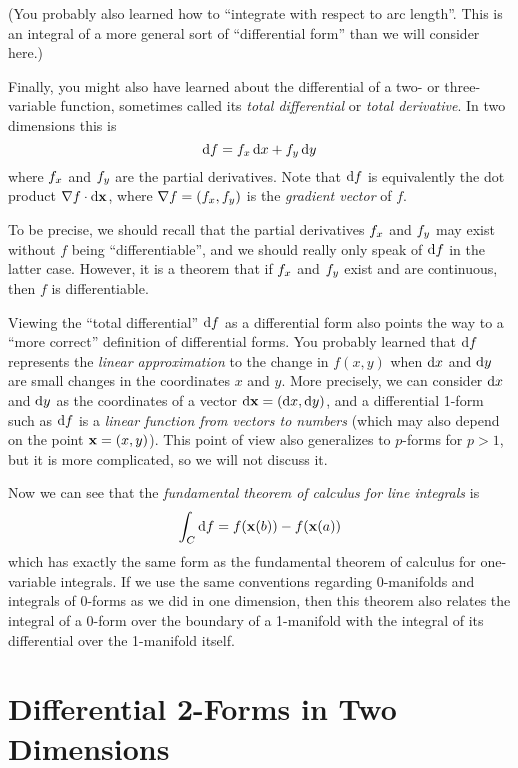 \documentclass[12pt]{amsart}
\begin{document}
(You probably also learned how to ``integrate with respect to arc length''.
This is an integral of a more general sort of ``differential form'' than we will consider here.)

Finally, you might also have learned about the differential of a two- or three-variable function, sometimes called its \emph{total differential} or \emph{total derivative}.
In two dimensions this is
\begin{equation}
  {\ensuremath{\mathrm{d} f}} = {f}_{x} \,{\mathrm{d} x} + {f}_{y} \,{\mathrm{d} y}\label{eq:differential-of-a-0form-in-2D}
\end{equation}
where ${f}_{x}$ and ${f}_{y}$ are the partial derivatives.
Note that ${\mathrm{d} f}$ is equivalently the dot product $\nabla f \cdot {\ensuremath{\mathrm{d} \mathbf{x}}}$, where $\nabla f = ({f}_{x},{f}_{y})$ is the \emph{gradient vector} of $f$.

To be precise, we should recall that the partial derivatives ${f}_{x}$ and ${f}_{y}$ may exist without $f$ being ``differentiable'', and we should really only speak of ${\mathrm{d} f}$ in the latter case.
However, it is a theorem that if ${f}_{x}$ and ${f}_{y}$ exist and are continuous, then $f$ is differentiable.

Viewing the ``total differential'' ${\mathrm{d} f}$ as a differential form also points the way to a ``more correct'' definition of differential forms.
You probably learned that ${\mathrm{d} f}$ represents the \emph{linear approximation} to the change in $f(x,y)$ when ${\mathrm{d} x}$ and ${\mathrm{d} y}$ are small changes in the coordinates $x$ and $y$.
More precisely, we can consider ${\mathrm{d} x}$ and ${\mathrm{d} y}$ as the coordinates of a vector ${\mathrm{d} \mathbf{x}} = ({\mathrm{d} x},{\mathrm{d} y})$, and a differential 1-form such as ${\mathrm{d} f}$ is a \emph{linear function from vectors to numbers} (which may also depend on the point $\mathbf{x} = (x,y)$).
This point of view also generalizes to $p$-forms for $p>1$, but it is more complicated, so we will not discuss it.

Now we can see that the \emph{fundamental theorem of calculus for line integrals} is
\[ \int_{C} {\mathrm{d} f} = f(\mathbf{x}(b)) - f(\mathbf{x}(a)) \]
which has exactly the same form as the fundamental theorem of calculus for one-variable integrals.
If we use the same conventions regarding 0-manifolds and integrals of 0-forms as we did in one dimension, then this theorem also relates the integral of a 0-form over the boundary of a 1-manifold with the integral of its differential over the 1-manifold itself.

\section{Differential 2-Forms in Two Dimensions}
\label{sec:2forms-in-2D}
\end{document}
